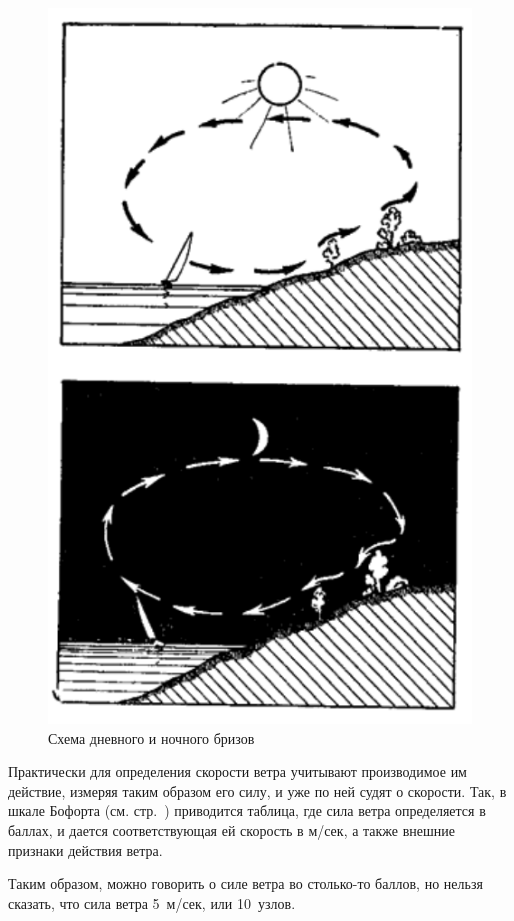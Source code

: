 \documentclass[a4paper, 12pt, twoside, final]{scrbook}
\begin{document}
\begin{figure}
	\centering
	\includegraphics[scale=1]{88_Shema_brizov}
	\caption{Схема дневного и ночного бризов}
	\label{fig:88}
\end{figure}

Практически для определения скорости ветра учитывают производимое им действие, измеряя таким образом его силу, и уже по ней судят о скорости. Так, в шкале Бофорта (см. стр.~\pageref{app:3}) приводится таблица, где сила ветра определяется в баллах, и дается соответствующая ей скорость в м/сек, а также внешние признаки действия ветра.

Таким образом, можно говорить о силе ветра во столько-то баллов, но нельзя сказать, что сила ветра 5~м/сек, или 10~узлов.
\end{document}

